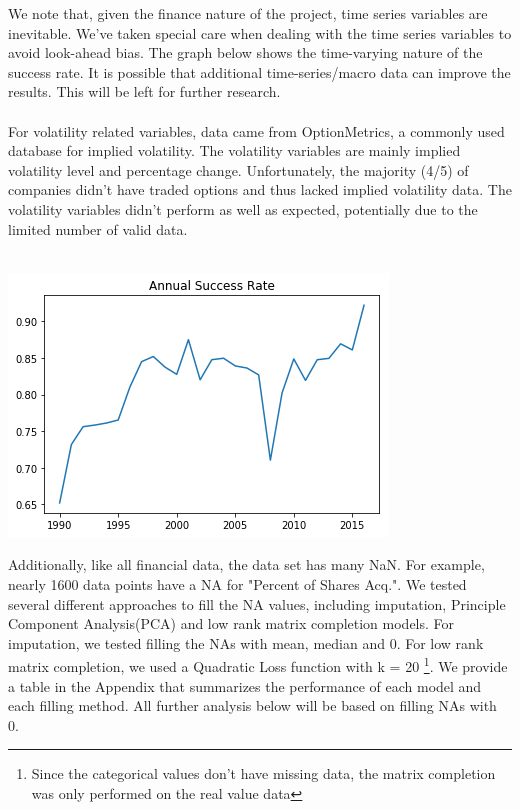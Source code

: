 \documentclass[a4paper]{article}
\begin{document}
We note that, given the finance nature of the project, time series variables are inevitable. We've taken special care when dealing with the time series variables to avoid look-ahead bias. The graph below shows the time-varying nature of the success rate. It is possible that additional time-series/macro data can improve the results. This will be left for further research.
\\
\\
For volatility related variables, data came from OptionMetrics, a commonly used database for implied volatility. The volatility variables are mainly implied volatility level and percentage change. Unfortunately, the majority (4/5) of companies didn't have traded options and thus lacked implied volatility data. The volatility variables didn't perform as well as expected, potentially due to the limited number of valid data.
\\
\\

\begin{center}
\includegraphics[scale=0.6]{success_rate.png}
\end{center}

Additionally, like all financial data, the data set has many NaN. For example, nearly 1600 data points have a NA for "Percent of Shares Acq.". We tested several different approaches to fill the NA values, including imputation, Principle Component Analysis(PCA) and low rank matrix completion models. For imputation, we tested filling the NAs with mean, median and 0. For low rank matrix completion, we used a Quadratic Loss function with k = 20 \footnote{Since the categorical values don't have missing data, the matrix completion was only performed on the real value data}. We provide a table in the Appendix that summarizes the performance of each model and each filling method. All further analysis below will be based on filling NAs with 0.
\end{document}
